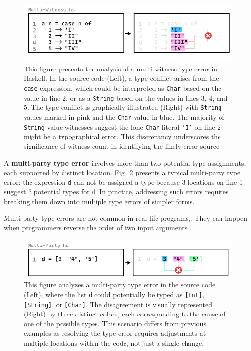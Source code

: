 \documentclass[pdflatex,sn-mathphys-num]{sn-jnl}%
\begin{document}
\begin{figure}[htbp]
\centering  \includegraphics[width=\linewidth]{Multi-Witness}
  \caption[This illustration depicts a multi-witness type error in Haskell]{
    \label{fig:multi-witness-example}
    This figure presents the analysis of a multi-witness type error in Haskell. In the source code (Left), a type conflict arises from the \texttt{case} expression, which could be interpreted as \texttt{Char} based on the value in line 2, or as a \texttt{String} based on the values in lines 3, 4, and 5. The type conflict is graphically illustrated (Right) with \texttt{String} values marked in pink and the \texttt{Char} value in blue. The majority of \texttt{String} value witnesses suggest the lone \texttt{Char} literal \texttt{'I'} on line 2 might be a typographical error. This discrepancy underscores the significance of witness count in identifying the likely error source.}
\end{figure}

A \textbf{multi-party type error} involves more than two potential type assignments, each supported by distinct location.  Fig.~\ref{fig:multi-party-example} presents a typical multi-party type error: the expression {\tt d} can not be assigned a type because 3 locations on line 1 suggest 3 potential types for \texttt{d}. In practice, addressing such errors requires breaking them down into multiple type errors of simpler forms. 

Multi-party type errors are not common in real life programs,. They can happen when programmers reverse the order of two input arguments. 

\begin{figure}[htbp]
\centering  \includegraphics[width=\linewidth]{Multi-Party}
  \caption[This illustration depicts a multi-party type error in Haskell]{
    \label{fig:multi-party-example}
    This figure analyzes a multi-party type error in the source code (Left), where the list \texttt{d} could potentially be typed as \texttt{[Int]}, \texttt{[String]}, or \texttt{[Char]}. The disagreement is visually represented (Right) by three distinct colors, each corresponding to the cause of one of the possible types. This scenario differs from previous examples as resolving the type error requires adjustments at multiple locations within the code, not just a single change.
       }
\end{figure}
  
\end{document}
